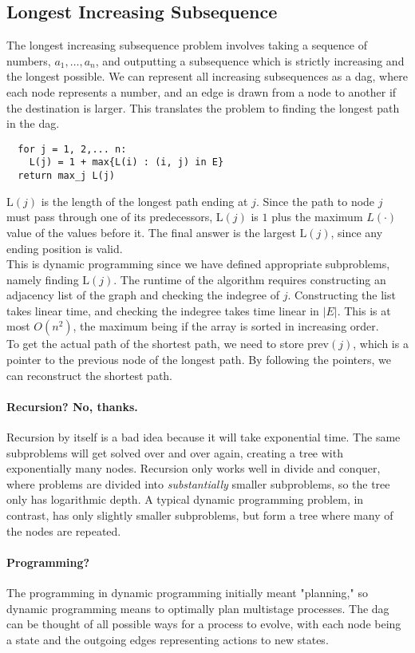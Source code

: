 \subsection{Longest Increasing Subsequence}
The longest increasing subsequence problem involves taking a sequence of numbers, $a_1,\ldots ,a_n$, and outputting a subsequence which is strictly increasing and the longest possible.
We can represent all increasing subsequences as a dag, where each node represents a number, and an edge is drawn from a node to another if the destination is larger.
This translates the problem to finding the longest path in the dag.
\begin{verbatim}
  for j = 1, 2,... n:
    L(j) = 1 + max{L(i) : (i, j) in E}
  return max_j L(j)
\end{verbatim}
$\text{L}(j)$ is the length of the longest path ending at $j$.
Since the path to node $j$ must pass through one of its predecessors, $\text{L}(j)$ is $1$ plus the maximum $L(\cdot)$ value of the values before it.
The final answer is the largest $\text{L}(j)$, since any ending position is valid.\\
This is dynamic programming since we have defined appropriate subproblems, namely finding $\text{L}(j)$.
The runtime of the algorithm requires constructing an adjacency list of the graph and checking the indegree of $j$.
Constructing the list takes linear time, and checking the indegree takes time linear in $|E|$.
This is at most $O(n^2)$, the maximum being if the array is sorted in increasing order.\\
To get the actual path of the shortest path, we need to store $\text{prev}(j)$, which is a pointer to the previous node of the longest path.
By following the pointers, we can reconstruct the shortest path.

\paragraph{Recursion? No, thanks.}
Recursion by itself is a bad idea because it will take exponential time.
The same subproblems will get solved over and over again, creating a tree with exponentially many nodes.
Recursion only works well in divide and conquer, where problems are divided into \textit{substantially} smaller subproblems, so the tree only has logarithmic depth.
A typical dynamic programming problem, in contrast, has only slightly smaller subproblems, but form a tree where many of the nodes are repeated.

\paragraph{Programming?}
The programming in dynamic programming initially meant "planning," so dynamic programming means to optimally plan multistage processes.
The dag can be thought of all possible ways for a process to evolve, with each node being a state and the outgoing edges representing actions to new states.

